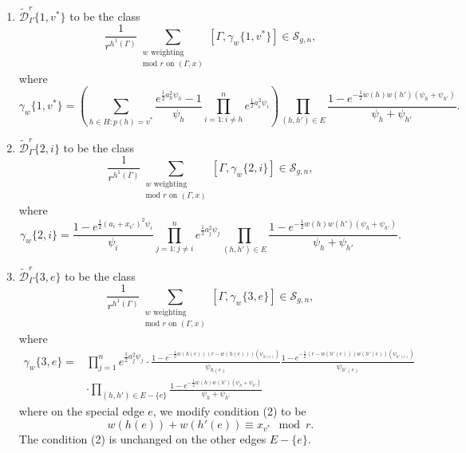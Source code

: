 \documentclass[12pt,reqno]{amsart}
\theoremstyle{plain}
\theoremstyle{definition}
\theoremstyle{remark}
\begin{document}
\begin{enumerate}[label=(\roman*)]
\item $\widetilde{\mathcal{D}}_{\Gamma}^r\{1,v^*\}$ to be the class
\begin{equation*}
  \frac 1{r^{h^1(\Gamma)}} \sum_{\substack{w \text{ weighting }\\ \text{mod } r \text{ on }(\Gamma,x)}} [\Gamma, \gamma_w\{1,v^*\}] \in \mathcal{S}_{g,n},
\end{equation*}
where
\begin{equation*}
  \gamma_w\{1,v^*\} =
\left(\sum_{h\in H:p(h)=v^*}\frac{e^{\frac{1}{2} a_h^2\psi_h}-1}{\psi_{h}}\prod_{i=1:i\neq h}^{n} e^{\frac{1}{2} a_i^2\psi_i}\right)
\prod_{(h,h')\in E} \frac{1 - e^{-\frac 12 w(h)w(h')(\psi_h + \psi_{h'})}}{\psi_h + \psi_{h'}}.
\end{equation*}
\item $\widetilde{\mathcal{D}}_{\Gamma}^r\{2,i\}$ to be the class
\begin{equation*}
  \frac 1{r^{h^1(\Gamma)}} \sum_{\substack{w \text{ weighting }\\ \text{mod } r \text{ on }(\Gamma,x)}} [\Gamma, \gamma_w\{2,i\}] \in \mathcal{S}_{g,n},
\end{equation*}
where
\begin{equation*}
  \gamma_w\{2,i\} =\frac{1-e^{\frac{1}{2}(a_i+x_{v^*})^2\psi_i}}{\psi_i}\prod_{j=1: j\neq i}^n e^{\frac 12 a_j^2\psi_j} \prod_{(h,h')\in E} \frac{1 - e^{-\frac 12 w(h)w(h')(\psi_h + \psi_{h'})}}{\psi_h + \psi_{h'}}.
\end{equation*}
\item $\widetilde{\mathcal{D}}_{\Gamma}^r\{3,e\}$ to be the class
\begin{equation*}
  \frac 1{r^{h^1(\Gamma)}} \sum_{\substack{w \text{ weighting }\\ \text{mod } r \text{ on }(\Gamma,x)}} [\Gamma, \gamma_w\{3,e\}] \in \mathcal{S}_{g,n},
\end{equation*}
where
\begin{align*}
\gamma_w\{3,e\}=&\prod_{j=1}^n e^{\frac 12 a_j^2\psi_j} \cdot \frac{1 - e^{-\frac{1}{2} w(h(e))(r-w(h(e)))(\psi_{h(e)} )}}{\psi_{h(e)}}
\frac{1 - e^{-\frac{1}{2}(r-w(h'(e)))w(h'(e)) ( \psi_{h'(e)})}}{ \psi_{h'(e)}}
\\&\cdot\prod_{(h,h')\in E-\{e\}} \frac{1 - e^{-\frac 12 w(h)w(h')(\psi_h + \psi_{h'})}}{\psi_h + \psi_{h'}}    
\end{align*}
where on the special edge $e$, we modify condition (2) to be  
\[w(h(e))+w(h'(e))\equiv x_{v^*}\mod r.\]
The condition (2) is unchanged on the other edges $E-\{e\}$. 
\end{enumerate}
\end{document}
